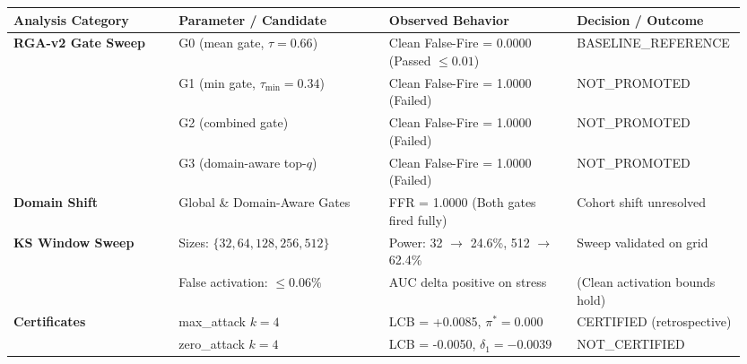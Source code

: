 \begin{tabular}{p{0.22\linewidth}p{0.28\linewidth}p{0.25\linewidth}p{0.20\linewidth}}
\toprule
\textbf{Analysis Category} & \textbf{Parameter / Candidate} & \textbf{Observed Behavior} & \textbf{Decision / Outcome} \\
\midrule
\textbf{RGA-v2 Gate Sweep} & G0 (mean gate, $\tau=0.66$) & Clean False-Fire = 0.0000 (Passed $\le 0.01$) & BASELINE\_REFERENCE \\
& G1 (min gate, $\tau_{\text{min}}=0.34$) & Clean False-Fire = 1.0000 (Failed) & NOT\_PROMOTED \\
& G2 (combined gate) & Clean False-Fire = 1.0000 (Failed) & NOT\_PROMOTED \\
& G3 (domain-aware top-$q$) & Clean False-Fire = 1.0000 (Failed) & NOT\_PROMOTED \\
\midrule
\textbf{Domain Shift} & Global \& Domain-Aware Gates & FFR = 1.0000 (Both gates fired fully) & Cohort shift unresolved \\
\midrule
\textbf{KS Window Sweep} & Sizes: $\{32, 64, 128, 256, 512\}$ & Power: 32 $\to$ 24.6\%, 512 $\to$ 62.4\% & Sweep validated on grid \\
& False activation: $\le 0.06\%$ & AUC delta positive on stress & (Clean activation bounds hold) \\
\midrule
\textbf{Certificates} & max\_attack $k=4$ & LCB = +0.0085, $\pi^* = 0.000$ & CERTIFIED (retrospective) \\
& zero\_attack $k=4$ & LCB = -0.0050, $\delta_1 = -0.0039$ & NOT\_CERTIFIED \\
\bottomrule
\end{tabular}
